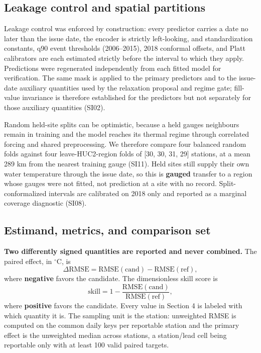 \subsection{Leakage control and spatial partitions}\label{leakage-control-and-spatial-partitions}

Leakage control was enforced by construction: every predictor carries a date no
later than the issue date, the encoder is strictly left-looking, and
standardization constants, q90 event thresholds (2006--2015), 2018 conformal
offsets, and Platt calibrators are each estimated strictly before the interval
to which they apply. Predictions were regenerated independently from each
fitted model for verification. The same mask is applied to the primary
predictors and to the issue-date auxiliary quantities used by the relaxation
proposal and regime gate; fill-value invariance is therefore established for
the predictors but not separately for those auxiliary quantities (SI02).

Random held-site splits can be optimistic, because a held gauge\textquotesingle s neighbours
remain in training and the model reaches its thermal regime through correlated
forcing and shared preprocessing. We therefore compare four balanced random
folds against four leave-HUC2-region folds of {[}30, 30, 31, 29{]} stations, at a
mean 289 km from the nearest training gauge (SI11). Held sites
still supply their own water temperature through the issue date, so this is
\textbf{gauged} transfer to a region whose gauges were not fitted, not prediction at
a site with no record. Split-conformalized intervals are calibrated on 2018 only
and reported as a marginal coverage diagnostic (SI08).

\subsection{Estimand, metrics, and comparison set}\label{estimand-metrics-and-comparison-set}

\textbf{Two differently signed quantities are reported and never combined.}
The paired effect, in \({}^\circ\)C, is
\begin{equation}
\Delta\mathrm{RMSE}
= \mathrm{RMSE}(\mathrm{cand}) - \mathrm{RMSE}(\mathrm{ref}),
\label{eq:delta-rmse}
\end{equation}
where \textbf{negative} favors the candidate. The dimensionless skill score is
\begin{equation}
\mathrm{skill}
= 1 - \frac{\mathrm{RMSE}(\mathrm{cand})}{\mathrm{RMSE}(\mathrm{ref})},
\label{eq:skill-score}
\end{equation}
where \textbf{positive} favors the candidate. Every value in Section 4 is
labeled with which quantity it is.
The sampling unit is the station: unweighted RMSE is computed on the common
daily keys per reportable station and the primary effect is the unweighted
median across stations, a station/lead cell being reportable only with at least
100 valid paired targets.

